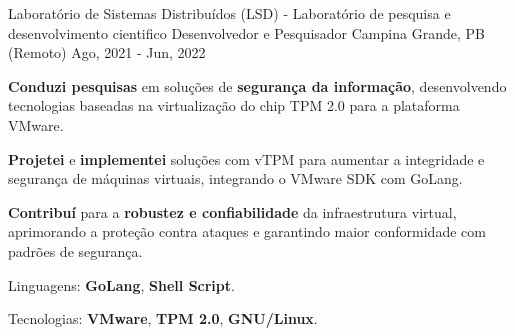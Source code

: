 \begin{cventries}
  \cventry
  {Laboratório de Sistemas Distribuídos (LSD) - Laboratório de pesquisa e desenvolvimento cientifico} %
  {Desenvolvedor e Pesquisador} %
  {Campina Grande, PB (Remoto)} %
  {Ago, 2021 - Jun, 2022} %
  {
    \begin{cvitems}
      \item {\textbf{Conduzi pesquisas} em soluções de \textbf{segurança da informação}, desenvolvendo tecnologias baseadas na virtualização do chip  {TPM 2.0} para a plataforma  {VMware}.}
      \item {\textbf{Projetei} e \textbf{implementei} soluções com {vTPM} para aumentar a integridade e segurança de máquinas virtuais, integrando o {VMware SDK} com {GoLang}.}
      \item {\textbf{Contribuí} para a \textbf{robustez e confiabilidade} da infraestrutura virtual, aprimorando a proteção contra ataques e garantindo maior conformidade com padrões de segurança.}
      \item {Linguagens: \textbf{GoLang}, \textbf{Shell Script}.}
      \item {Tecnologias: \textbf{VMware}, \textbf{TPM 2.0}, \textbf{GNU/Linux}.}
    \end{cvitems}
  }



\end{cventries}
